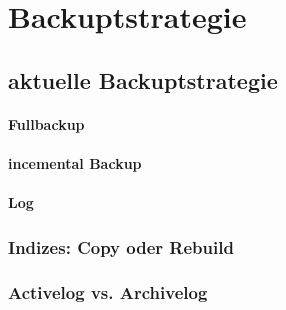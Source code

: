 \chapter{Backuptstrategie}

\section{aktuelle Backuptstrategie}

\subsubsection{Fullbackup}
\loreipsum

\subsubsection{incemental Backup}
\loreipsum

\subsubsection{Log}
\loreipsum

\subsection[Indizes]{Indizes: Copy oder Rebuild}
\loreipsum

\subsection{Activelog vs. Archivelog}
\loreipsum
